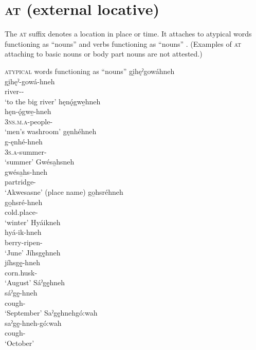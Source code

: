 \section{ \textsc{at} (external locative)} \label{-hneh}
The  \textsc{at} suffix denotes a location in place or time. It attaches to atypical words functioning as “nouns”  and verbs functioning as “nouns” . (Examples of  \textsc{at} attaching to basic nouns or body part nouns are not attested.)

\ea\label{ex:locex8} \textsc{atypical} words functioning as “nouns”
\ea gi̱hęˀgowáhneh\\
\gll gi̱hęˀ-gowá-hneh\\
 river-{\augmentative}-\\
\glt `to the big river'
\ex hęnǫ́gwe̱hneh \\
\gll hęn-ǫ́gwe̱-hneh\\
\textsc{3ns.m.a}-people-\\
\glt ‘men’s washroom’ 
\ex gęnhéhneh\\
\gll g-ęnhé-hneh\\
 \textsc{3s.a}-summer-\\
\glt `summer'
\ex Gwésa̱hsneh\\
\gll gwésa̱hs-hneh\\
 partridge-\\
\glt `Akwesasne' (place name)
\ex go̱hsréhneh\\
\gll go̱hsré-hneh\\
 cold.place-\\
\glt `winter'
\ex Hyáikneh\\
\gll hyá-ik-hneh\\
 berry-ripen-\\
\glt `June'
\ex Jíhsgę̱hneh\\
\gll jíhsgę̱-hneh\\
 corn.husk-\\
\glt `August'
\ex Sáˀgę̱hneh\\
\gll sáˀgę̱-hneh\\
 cough-\\
\glt `September'
\ex Saˀgę̱hnehgó:wah\\
\gll saˀgę̱-hneh-gó:wah\\
 cough-\\
\glt `October'
\z
\z

